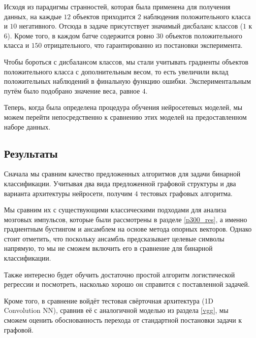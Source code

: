 \documentclass[12pt]{article}
\begin{document}
Исходя из парадигмы странностей, которая была применена для получения данных, на каждые $12$ объектов приходится $2$ наблюдения положительного класса и $10$ негативного. Отсюда в задаче присутствует значимый дисбаланс классов ($1$ к $6$). Кроме того, в каждом батче содержится ровно $30$ объектов положительного класса и $150$ отрицательного, что гарантированно из постановки эксперимента.

Чтобы бороться с дисбалансом классов, мы стали учитывать градиенты объектов положительного класса с дополнительным весом, то есть увеличили вклад положительных наблюдений в финальную функцию ошибки. Экспериментальным путём было подобрано значение веса, равное $4$.

Теперь, когда была определена процедура обучения нейросетевых моделей, мы можем перейти непосредственно к сравнению этих моделей на предоставленном наборе данных.

\subsection{Результаты}
\label{results}

Сначала мы сравним качество предложенных алгоритмов для задачи бинарной классификации. Учитывая два вида предложенной графовой структуры и два варианта архитектуры нейросети, получим $4$ тестовых графовых алгоритма.

Мы сравним их с существующими классическими подходами для анализа мозговых импульсов, которые были рассмотрены в разделе \ref{p300_res}, а именно градиентным бустингом и ансамблем на основе метода опорных векторов. Однако стоит отметить, что поскольку ансамбль предсказывает целевые символы напрямую, то мы не сможем включить его в сравнение для бинарной классификации.

Также интересно будет обучить достаточно простой алгоритм логистической регрессии и посмотреть, насколько хорошо он справится с поставленной задачей.

Кроме того, в сравнение войдёт тестовая свёрточная архитектура (1D Convolution NN), сравнив её с аналогичной моделью из раздела \ref{vgg}, мы сможем оценить обоснованность перехода от стандартной постановки задачи к графовой.
\end{document}
